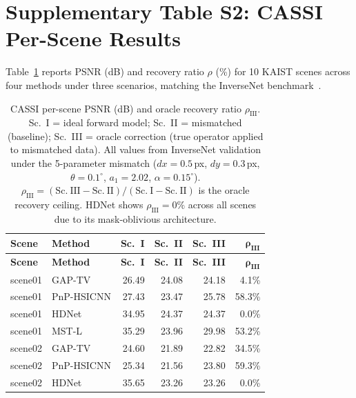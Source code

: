 \documentclass[11pt]{article}
\begin{document}
\newpage

\section{Supplementary Table S2: CASSI Per-Scene Results}
\label{sec:cassi_scenes}

Table~\ref{tab:cassi_scenes} reports PSNR (dB) and recovery ratio $\rho$ (\%) for 10 KAIST scenes across
four methods under three scenarios, matching the InverseNet benchmark~\cite{yang2026inversenet}.

\begin{footnotesize}
\begin{longtable}{l l r r r r}
\caption{CASSI per-scene PSNR (dB) and oracle recovery ratio $\rho_{\mathrm{III}}$.  Sc.~I = ideal forward model;
Sc.~II = mismatched (baseline); Sc.~III = oracle correction (true operator applied to mismatched data).
All values from InverseNet validation under the 5-parameter mismatch ($dx{=}0.5$\,px, $dy{=}0.3$\,px, $\theta{=}0.1^\circ$, $a_1{=}2.02$, $\alpha{=}0.15^\circ$).
$\rho_{\mathrm{III}} = (\mathrm{Sc.~III} - \mathrm{Sc.~II}) / (\mathrm{Sc.~I} - \mathrm{Sc.~II})$ is the oracle recovery ceiling.
HDNet shows $\rho_{\mathrm{III}}{=}0\%$ across all scenes due to its mask-oblivious architecture.}
\label{tab:cassi_scenes} \\
\toprule
\textbf{Scene} & \textbf{Method} &
  \textbf{Sc.~I} & \textbf{Sc.~II} & \textbf{Sc.~III} & $\boldsymbol{\rho}_{\textbf{III}}$ \\
\midrule
\endfirsthead
\toprule
\textbf{Scene} & \textbf{Method} &
  \textbf{Sc.~I} & \textbf{Sc.~II} & \textbf{Sc.~III} & $\boldsymbol{\rho}_{\textbf{III}}$ \\
\midrule
\endhead
\bottomrule
\endlastfoot
scene01 & GAP-TV        & 26.49 & 24.08 & 24.18 & 4.1\% \\
scene01 & PnP-HSICNN    & 27.43 & 23.47 & 25.78 & 58.3\% \\
scene01 & HDNet         & 34.95 & 24.37 & 24.37 & 0.0\% \\
scene01 & MST-L         & 35.29 & 23.96 & 29.98 & 53.2\% \\
\midrule
scene02 & GAP-TV        & 24.60 & 21.89 & 22.82 & 34.5\% \\
scene02 & PnP-HSICNN    & 25.34 & 21.56 & 23.80 & 59.3\% \\
scene02 & HDNet         & 35.65 & 23.26 & 23.26 & 0.0\% \\

\end{longtable}
\end{footnotesize}
\end{document}
